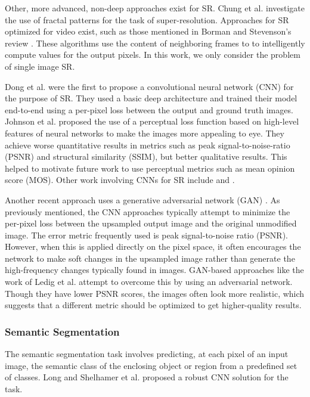 \documentclass[10pt,twocolumn,letterpaper]{article}
\begin{document}
Other, more advanced, non-deep approaches exist for SR. Chung et al.
\cite{FractalSR} investigate the use of fractal patterns for the task of
super-resolution. Approaches for SR optimized for video exist, such as those
mentioned in Borman and Stevenson's review \cite{VideoSR}. These algorithms use
the content of neighboring frames to to intelligently compute values for the
output pixels. In this work, we only consider the problem of single image SR.

Dong et al. \cite{SRCNN} were the first to propose a convolutional neural
network (CNN) for the purpose of SR.  They used a basic deep architecture and
trained their model end-to-end using a per-pixel loss between the output and
ground truth images. Johnson et al.  \cite{PerceptualLosses} proposed the use
of a perceptual loss function based on high-level features of neural networks
to make the images more appealing to eye. They achieve worse quantitative
results in metrics such as peak signal-to-noise-ratio (PSNR) and structural
similarity (SSIM), but better qualitative results. This helped to motivate
future work to use perceptual metrics such as mean opinion score (MOS). Other
work involving CNNs for SR include \cite{RealtimeCNN} and
\cite{DeeplyRecursive}.

Another recent approach uses a generative adversarial network (GAN) \cite{GAN}.
As previously mentioned, the CNN approaches typically attempt to minimize the
per-pixel loss between the upsampled output image and the original unmodified
image. The error metric frequently used is peak signal-to-noise ratio (PSNR).
However, when this is applied directly on the pixel space, it often
encourages the network to make soft changes in the upsampled image rather than
generate the high-frequency changes typically found in images. GAN-based
approaches like the work of Ledig et al. \cite{SRGAN} attempt to overcome this
by using an adversarial network. Though they have lower PSNR scores, the images
often look more realistic, which suggests that a different metric should be
optimized to get higher-quality results.

\subsubsection{Semantic Segmentation}
The semantic segmentation task involves predicting, at each pixel of an input
image, the semantic class of the enclosing object or region from a predefined
set of classes. Long and Shelhamer et al. \cite{FullyConvolutionalSS} proposed
a robust CNN solution for the task.
\end{document}
